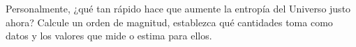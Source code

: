 \item Personalmente, ¿qué tan rápido hace que aumente la entropía del Universo justo ahora? Calcule un orden de magnitud, establezca qué cantidades toma como datos y los valores que mide o estima para ellos.
